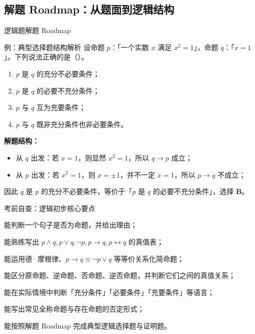 \documentclass[a4paper,11pt]{ctexart}
\begin{document}
\subsection{解题 Roadmap：从题面到逻辑结构}

\begin{NoteRoadmap}{逻辑题解题 Roadmap}
\end{NoteRoadmap}

\begin{examplebox}{例：典型选择题结构解析}
  设命题 $p$：「一个实数 $x$ 满足 $x^2=1$」，命题 $q$：「$x=1$」。下列说法正确的是（\quad）。
  \begin{enumerate}
    \item $p$ 是 $q$ 的充分不必要条件；
    \item $p$ 是 $q$ 的必要不充分条件；
    \item $p$ 与 $q$ 互为充要条件；
    \item $p$ 与 $q$ 既非充分条件也非必要条件。
  \end{enumerate}

  \textbf{解题结构：}
  \begin{itemize}
    \item 从 $q$ 出发：若 $x=1$，则显然 $x^2=1$，所以 $q\to p$ 成立；
    \item 从 $p$ 出发：若 $x^2=1$，则 $x=\pm1$，并不一定 $x=1$，所以 $p\to q$ 不成立；
  \end{itemize}
  因此 $q$ 是 $p$ 的充分不必要条件，等价于「$p$ 是 $q$ 的必要不充分条件」，选择 \textbf{B}。
\end{examplebox}

\begin{NoteChecklist}{考前自查：逻辑初步核心要点}
  \item 能判断一个句子是否为命题，并给出理由；
  \item 能熟练写出 $p\land q,p\lor q,\neg p,p\to q,p\leftrightarrow q$ 的真值表；
  \item 能运用德·摩根律、$p\to q\equiv\neg p\lor q$ 等等价关系化简命题；
  \item 能区分原命题、逆命题、否命题、逆否命题，并判断它们之间的真值关系；
  \item 能在实际情境中判断「充分条件」「必要条件」「充要条件」等语言；
  \item 能写出常见全称命题与存在命题的否定形式；
  \item 能按照解题 Roadmap 完成典型逻辑选择题与证明题。
\end{NoteChecklist}
\end{document}

